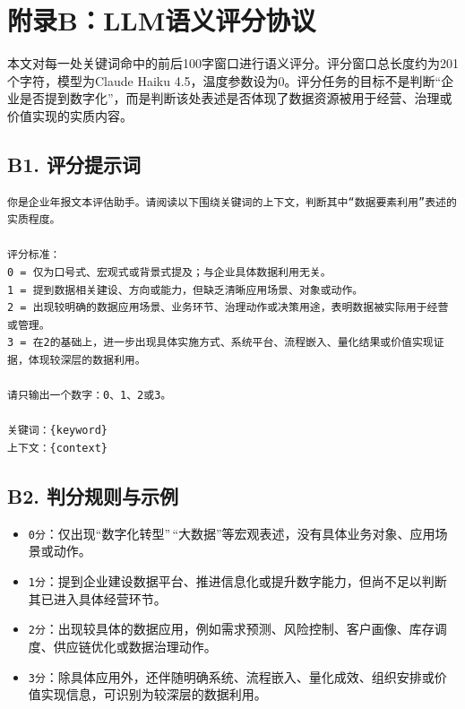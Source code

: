 \section{附录B：LLM语义评分协议}\label{ux9644ux5f55bllmux8bedux4e49ux8bc4ux5206ux534fux8bae}

本文对每一处关键词命中的前后100字窗口进行语义评分。评分窗口总长度约为201个字符，模型为Claude Haiku 4.5，温度参数设为0。评分任务的目标不是判断``企业是否提到数字化''，而是判断该处表述是否体现了数据资源被用于经营、治理或价值实现的实质内容。

\subsection{B1. 评分提示词}\label{b1-ux8bc4ux5206ux63d0ux793aux8bcd}

\begin{verbatim}
你是企业年报文本评估助手。请阅读以下围绕关键词的上下文，判断其中“数据要素利用”表述的实质程度。

评分标准：
0 = 仅为口号式、宏观式或背景式提及；与企业具体数据利用无关。
1 = 提到数据相关建设、方向或能力，但缺乏清晰应用场景、对象或动作。
2 = 出现较明确的数据应用场景、业务环节、治理动作或决策用途，表明数据被实际用于经营或管理。
3 = 在2的基础上，进一步出现具体实施方式、系统平台、流程嵌入、量化结果或价值实现证据，体现较深层的数据利用。

请只输出一个数字：0、1、2或3。

关键词：{keyword}
上下文：{context}
\end{verbatim}

\subsection{B2. 判分规则与示例}\label{b2-ux5224ux5206ux89c4ux5219ux4e0eux793aux4f8b}

\begin{itemize}
\tightlist
\item
  \texttt{0分}：仅出现``数字化转型''\,``大数据''等宏观表述，没有具体业务对象、应用场景或动作。
\item
  \texttt{1分}：提到企业建设数据平台、推进信息化或提升数字能力，但尚不足以判断其已进入具体经营环节。
\item
  \texttt{2分}：出现较具体的数据应用，例如需求预测、风险控制、客户画像、库存调度、供应链优化或数据治理动作。
\item
  \texttt{3分}：除具体应用外，还伴随明确系统、流程嵌入、量化成效、组织安排或价值实现信息，可识别为较深层的数据利用。
\end{itemize}

